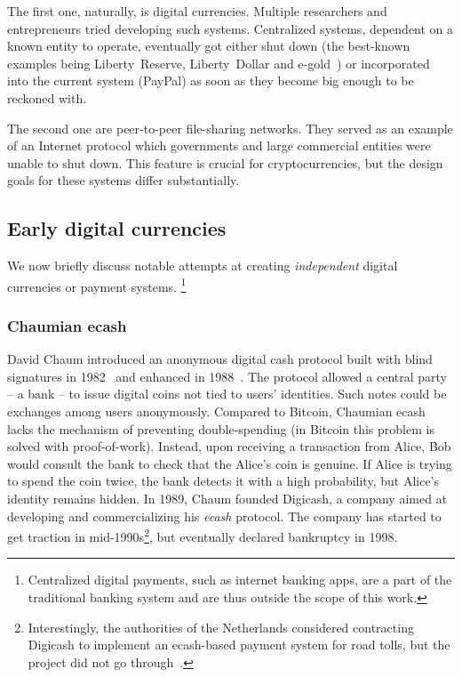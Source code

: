 The first one, naturally, is digital currencies.
Multiple researchers and entrepreneurs tried developing such systems.
Centralized systems, dependent on a known entity to operate, eventually got either shut down (the best-known examples being Liberty~Reserve, Liberty~Dollar and e-gold~\cite{White2014, Trautman2014}) or incorporated into the current system (PayPal) as soon as they become big enough to be reckoned with.


The second one are peer-to-peer file-sharing networks.
They served as an example of an Internet protocol which governments and large commercial entities were unable to shut down.
This feature is crucial for cryptocurrencies, but the design goals for these systems differ substantially.


\subsection{Early digital currencies}

We now briefly discuss notable attempts at creating \textit{independent} digital currencies or payment systems.
\footnote{Centralized digital payments, such as internet banking apps, are a part of the traditional banking system and are thus outside the scope of this work.}

\subsubsection*{Chaumian ecash}

David Chaum introduced an anonymous digital cash protocol built with blind signatures in 1982~\cite{Chaum1982} and enhanced in 1988~\cite{Chaum1988}.
The protocol allowed a central party -- a bank -- to issue digital coins not tied to users' identities.
Such notes could be exchanges among users anonymously.
Compared to Bitcoin, Chaumian ecash lacks the mechanism of preventing double-spending (in Bitcoin this problem is solved with proof-of-work).
Instead, upon receiving a transaction from Alice, Bob would consult the bank to check that the Alice's coin is genuine.
If Alice is trying to spend the coin twice, the bank detects it with a high probability, but Alice's identity remains hidden.
In 1989, Chaum founded Digicash, a company aimed at developing and commercializing his \textit{ecash} protocol.
The company has started to get traction in mid-1990s\footnote{Interestingly, the authorities of the Netherlands considered contracting Digicash to implement an ecash-based payment system for road tolls, but the project did not go through~\cite{Chaum2019}.}, but eventually declared bankruptcy in 1998.

